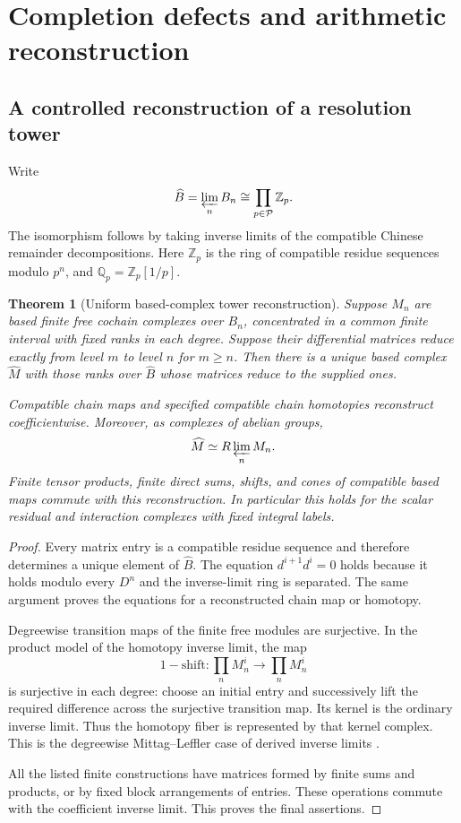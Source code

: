 \documentclass[11pt]{article}
\newtheorem{theorem}{Theorem}[section]
\theoremstyle{definition}
\theoremstyle{remark}
\begin{document}
\section{Completion defects and arithmetic reconstruction}\label{sec:completion-reconstruction}

\subsection{A controlled reconstruction of a resolution tower}

Write
\[
 \widehat B=\varprojlim_n B_n\cong\prod_{p\in\mathcal P}\mathbb Z_p.
\]
The isomorphism follows by taking inverse limits of the compatible Chinese remainder decompositions. Here $\mathbb Z_p$ is the ring of compatible residue sequences modulo $p^n$, and $\mathbb Q_p=\mathbb Z_p[1/p]$.

\begin{theorem}[Uniform based-complex tower reconstruction]\label{thm:based-tower-reconstruction}
Suppose $M_n$ are based finite free cochain complexes over $B_n$, concentrated in a common finite interval with fixed ranks in each degree. Suppose their differential matrices reduce exactly from level $m$ to level $n$ for $m\geq n$. Then there is a unique based complex $\widehat M$ with those ranks over $\widehat B$ whose matrices reduce to the supplied ones.

Compatible chain maps and specified compatible chain homotopies reconstruct coefficientwise. Moreover, as complexes of abelian groups,
\[
 \widehat M\simeq R\varprojlim_n M_n.
\]
Finite tensor products, finite direct sums, shifts, and cones of compatible based maps commute with this reconstruction. In particular this holds for the scalar residual and interaction complexes with fixed integral labels.
\end{theorem}
\begin{proof}
Every matrix entry is a compatible residue sequence and therefore determines a unique element of $\widehat B$. The equation $d^{i+1}d^i=0$ holds because it holds modulo every $D^n$ and the inverse-limit ring is separated. The same argument proves the equations for a reconstructed chain map or homotopy.

Degreewise transition maps of the finite free modules are surjective. In the product model of the homotopy inverse limit, the map
\[
 1-\mathrm{shift}:\prod_n M_n^i\longrightarrow\prod_n M_n^i
\]
is surjective in each degree: choose an initial entry and successively lift the required difference across the surjective transition map. Its kernel is the ordinary inverse limit. Thus the homotopy fiber is represented by that kernel complex. This is the degreewise Mittag--Leffler case of derived inverse limits \cite{StacksRlim}.

All the listed finite constructions have matrices formed by finite sums and products, or by fixed block arrangements of entries. These operations commute with the coefficient inverse limit. This proves the final assertions.
\end{proof}
\end{document}
